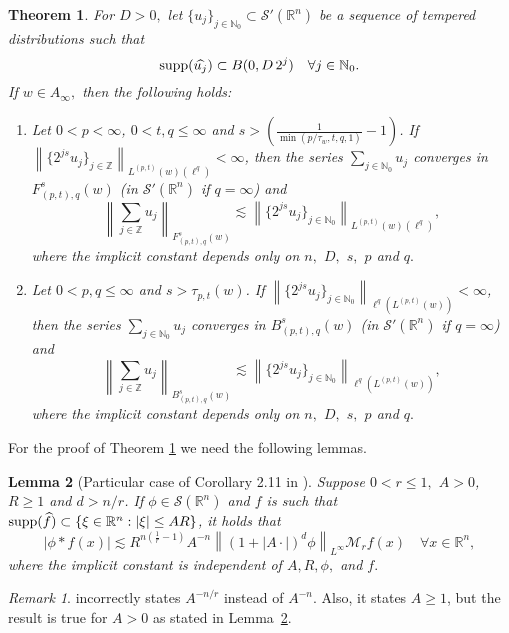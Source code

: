 \documentclass[10pt,a4paper]{article}
\newtheorem{theorem}{Theorem}[section]
\newtheorem{lemma}[theorem]{Lemma}
\theoremstyle{remark}
\newtheorem{remark}{Remark}[section]
\newcommand{\naz}{\mathbb{N}_0}
\newcommand{\ent}{\mathbb{Z}}
\newcommand{\rn}{{{\mathbb R}^n}}
\newcommand{\sw}{{\mathcal{S}}(\rn)}
\newcommand{\itlw}[4]{F_{#1,#3}^{#2}(#4)} %
\newcommand{\ibesw}[4]{B_{#1,#3}^{#2}(#4)} %
\newcommand{\M}{\mathcal{M}} %
\newcommand{\abs}[1]{\left\vert #1 \right\vert}
\newcommand{\norm}[2]{\left\|#1\right\|_{#2}}
\newcommand{\supp}{{\rm{supp}}}
\newcommand{\A}{D}
\newcommand{\ex}{d}
\begin{document}
\begin{theorem}\label{thm:Nikolskij:Lorrentz:weighted} For $\A> 0,$ let $\{u_j\}_{j \in \naz} \subset \mathcal{S}'(\rn)$ be a sequence of tempered distributions such that
\begin{equation*}
\supp(\widehat{u_j}) \subset B(0, \A\, 2^j ) \quad \forall j \in \naz.
\end{equation*}
If $w\in A_\infty,$ then the following holds:  
\begin{enumerate}
\item[(i)]\label{item:thh:Nikolskij:Lorrentz:TL} Let $0 < p < \infty$, $0 < t,q \leq \infty$ and $s > \left(\frac{1}{\min(p/\tau_w,t,q,1)} - 1 \right)$. If $\norm{\{2^{js} u_j\}_{j\in\ent}}{L^{(p,t)}(w)(\ell^{q})} < \infty$, then the series $\sum_{j \in \naz} u_j$ converges in $\itlw{(p,t)}{s}{q}{w}$ (in $\mathcal{S}'(\rn)$ if $q=\infty$) and 
\begin{equation*}
\norm{\sum_{j \in \ent} u_j}{\itlw{(p,t)}{s}{q}{w}} \lesssim  \norm{\{2^{js} u_j\}_{j\in\naz}}{L^{(p,t)}(w)(\ell^{q})},
\end{equation*}
where the implicit constant depends only on $n,$ $\A,$ $s,$ $p$ and  $q.$
\item[(ii)]\label{item:thh:Nikolskij:Lorrentz:B} Let $0 < p, q \leq \infty$ and $s > \tau_{p,t}(w)$. If $\norm{\{2^{js} u_j\}_{j\in\naz}}{\ell^{q}(L^{(p,t)}(w))} < \infty$, then the series $\sum_{j \in \naz} u_j$ converges in  $\ibesw{(p,t)}{s}{q}{w}$ (in $\mathcal{S}'(\rn)$ if $q=\infty$) and 
\begin{equation*}
\norm{\sum_{j \in \ent} u_j}{\ibesw{(p,t)}{s}{q}{w}} \lesssim  \norm{\{2^{js} u_j\}_{j\in\naz}}{\ell^{q}(L^{(p,t)}(w))},
\end{equation*}
where the implicit constant depends only on $n,$ $\A,$ $s,$ $p$ and $q.$
\end{enumerate}
\end{theorem}
For the proof of Theorem \ref{thm:Nikolskij:Lorrentz:weighted} we need the following lemmas.

\begin{lemma}[Particular case of Corollary 2.11 in \cite{MR837335}]\label{coro:2:11}
Suppose $0 < r \leq 1,$  $A >0$, $R \geq 1$ and $\ex > n/r$. If $\phi \in \sw$ and $f$ is such that  $\supp(\widehat{f}) \subset \{\xi\in\rn:\abs{\xi}\le AR\}$, it holds that
\begin{equation*}
|\phi * f(x)| \lesssim R^{n (\frac{1}{r}  -1)} A^{-n} \norm{(1 + |A \cdot|)^\ex \phi}{L^\infty}  \M_rf(x) \quad \forall x \in \rn,
\end{equation*}
where the implicit constant is independent of $A, R, \phi,$ and $f.$  
\end{lemma}
\begin{remark} \cite[Corollary 2.11]{MR837335} incorrectly states $A^{-n/r}$ instead of $ A^{-n}$. Also, it states $A \geq 1$, but the result is true for $A >0$ as stated in Lemma~\ref{coro:2:11}.
\end{remark}
\end{document}
